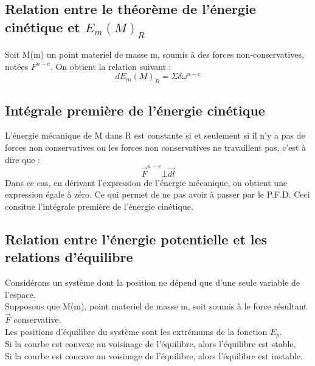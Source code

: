 \subsection{Relation entre le théorème de l'énergie cinétique et $E_m(M)_R$}
Soit M(m) un point materiel de masse m, soumis à des forces non-conservatives, notées $F^{n-c}$.
On obtient la relation suivant :
$$dE_m(M)_R = \Sigma \delta \omega^{n-c}$$
\subsection{Intégrale première de l'énergie cinétique}
L'énergie mécanique de M dans R est constante si et seulement si il n'y a pas de forces non conservatives ou les forces non conservatives ne travaillent pas, c'est à dire que : $$\overrightarrow{F}^{n-c} \bot \overrightarrow{dl}$$
Dans ce cas, en dérivant l'expression de l'énergie mécanique, on obtient une expression égale à zéro. Ce qui permet de ne pas avoir à passer par le P.F.D. Ceci consitue l'intégrale première de l'énergie cinétique.
\subsection{Relation entre l'énergie potentielle et les relations d'équilibre}
Considérons un système dont la position ne dépend que d'une seule variable de l'espace.\\
Supposons que M(m), point materiel de masse m, soit soumis à le force résultant $\overrightarrow{F}$ conservative.\\
Les positions d'équilibre du système sont les extrémums de la fonction $E_p$.\\
Si la courbe est convexe au voisinage de l'équilibre, alors l'équilibre est stable.\\
Si la courbe est concave au voisinage de l'équilibre, alors l'équilibre est instable. \\
